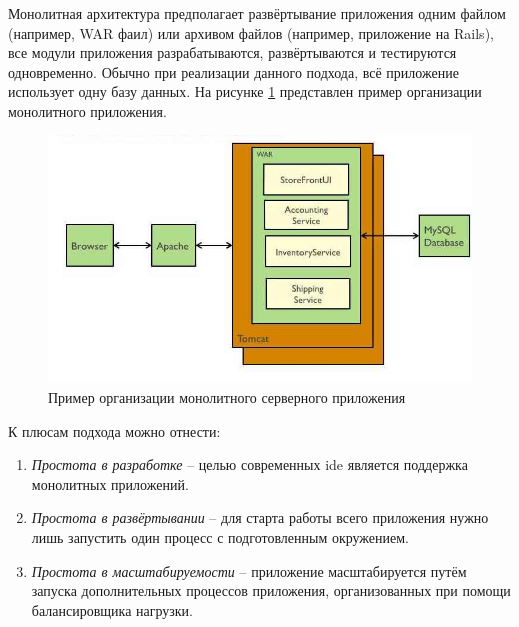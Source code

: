 \subsubsection {}
\label{sec:analysis:research:backArch:monolith}

Монолитная архитектура предполагает развёртывание приложения одним файлом (например, WAR фаил) или архивом файлов (например, приложение на Rails), все модули приложения разрабатываются, развёртываются и тестируются одновременно. Обычно при реализации данного подхода, всё приложение использует одну базу данных. На рисунке \ref{sec:analysis:research:arch:back:monolith} представлен пример организации монолитного приложения\cite{microservices:ma}.

\begin{figure}[h]
  \centering
    \includegraphics[width=1\textwidth]{inc/img/backend-monolith.jpg}
  \caption{Пример организации монолитного серверного приложения}
  \label{sec:analysis:research:arch:back:monolith}
\end{figure}

К плюсам подхода можно отнести:

\begin{enumerate}
	\item \emph{Простота в разработке} -- целью современных \gls{ide} является поддержка монолитных приложений.
	\item \emph{Простота в развёртывании} -- для старта работы всего приложения нужно лишь запустить один процесс с подготовленным окружением.
	\item \emph{Простота в масштабируемости} -- приложение масштабируется путём запуска дополнительных процессов приложения, организованных при помощи балансировщика нагрузки.
\end{enumerate}

